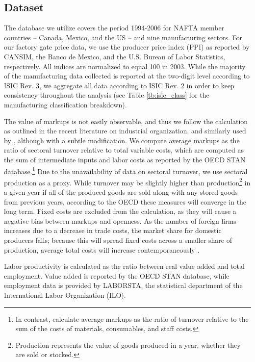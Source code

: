 \documentclass[a4paper,12pt]{article}
\begin{document}
\subsection{Dataset}

The database we utilize covers the period 1994-2006 for NAFTA member countries -- Canada, Mexico, and the US -- and nine manufacturing sectors. For our factory gate price data, we use the producer price index (PPI) as reported by CANSIM, the Banco de Mexico, and the U.S. Bureau of Labor Statistics, respectively. All indices are normalized to equal 100 in 2003. While the majority of the manufacturing data collected is reported at the two-digit level according to ISIC Rev. 3, we aggregate all data according to ISIC Rev. 2 in order to keep consistency throughout the analysis (see Table \ref{tb:isic_class} for the manufacturing classification breakdown). 

The value of markups is not easily observable, and thus we follow the calculation as outlined in the recent literature on industrial organization, and similarly used by \citet{Chen2009}, although with a subtle modification. We compute average markups as the ratio of sectoral turnover relative to total variable costs, which are computed as the sum of intermediate inputs and labor costs as reported by the OECD STAN database.\footnote{In contrast, \citet{Chen2009} calculate average markups as the ratio of turnover relative to the sum of the costs of materials, consumables, and staff costs.} Due to the unavailability of data on sectoral turnover, we use sectoral production as a proxy. While turnover may be slightly higher than production\footnote{Production represents the value of goods produced in a year, whether they are sold or stocked.} in a given year if all of the produced goods are sold along with any stored goods from previous years, according to the OECD these measures will converge in the long term. Fixed costs are excluded from the calculation, as they will cause a negative bias between markups and openness. As the number of foreign firms increases due to a decrease in trade costs, the market share for domestic producers falls; because this will spread fixed costs across a smaller share of production, average total costs will increase contemporaneously \citep{Chen2009}. 

Labor productivity is calculated as the ratio between real value added and total employment. Value added is reported by the OECD STAN database, while employment data is provided by LABORSTA, the statistical department of the International Labor Organization (ILO). 
\end{document}
